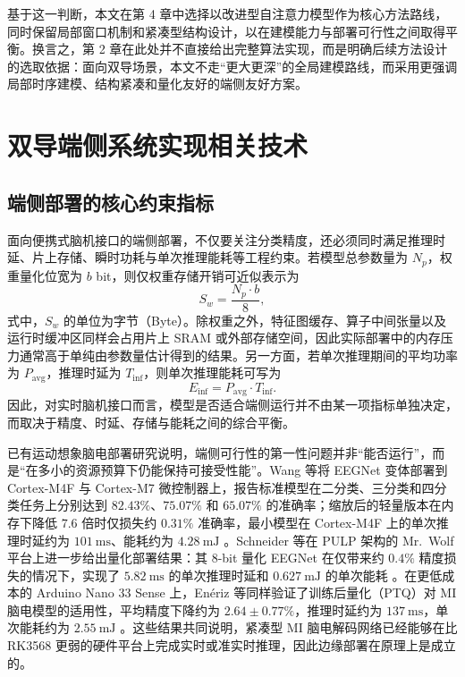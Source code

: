 基于这一判断，本文在第 4 章中选择以改进型自注意力模型作为核心方法路线，同时保留局部窗口机制和紧凑型结构设计，以在建模能力与部署可行性之间取得平衡。换言之，第 2 章在此处并不直接给出完整算法实现，而是明确后续方法设计的选取依据：面向双导场景，本文不走“更大更深”的全局建模路线，而采用更强调局部时序建模、结构紧凑和量化友好的端侧友好方案。

\section{双导端侧系统实现相关技术}

\subsection{端侧部署的核心约束指标}

面向便携式脑机接口的端侧部署，不仅要关注分类精度，还必须同时满足推理时延、片上存储、瞬时功耗与单次推理能耗等工程约束。若模型总参数量为 $N_p$，权重量化位宽为 $b$ bit，则仅权重存储开销可近似表示为
\begin{equation}
S_w = \frac{N_p \cdot b}{8},
\label{eq:edge_weight_storage}
\end{equation}
式中，$S_w$ 的单位为字节（Byte）。除权重之外，特征图缓存、算子中间张量以及运行时缓冲区同样会占用片上 SRAM 或外部存储空间，因此实际部署中的内存压力通常高于单纯由参数量估计得到的结果。另一方面，若单次推理期间的平均功率为 $P_{\mathrm{avg}}$，推理时延为 $T_{\mathrm{inf}}$，则单次推理能耗可写为
\begin{equation}
E_{\mathrm{inf}} = P_{\mathrm{avg}} \cdot T_{\mathrm{inf}}.
\label{eq:edge_energy}
\end{equation}
因此，对实时脑机接口而言，模型是否适合端侧运行并不由某一项指标单独决定，而取决于精度、时延、存储与能耗之间的综合平衡。

已有运动想象脑电部署研究说明，端侧可行性的第一性问题并非“能否运行”，而是“在多小的资源预算下仍能保持可接受性能”。Wang 等将 EEGNet 变体部署到 Cortex-M4F 与 Cortex-M7 微控制器上，报告标准模型在二分类、三分类和四分类任务上分别达到 $82.43\%$、$75.07\%$ 和 $65.07\%$ 的准确率；缩放后的轻量版本在内存下降低 $7.6$ 倍时仅损失约 $0.31\%$ 准确率，最小模型在 Cortex-M4F 上的单次推理时延约为 $101\ \text{ms}$、能耗约为 $4.28\ \text{mJ}$ \cite{Wan20}。Schneider 等在 PULP 架构的 Mr.\ Wolf 平台上进一步给出量化部署结果：其 8-bit 量化 EEGNet 在仅带来约 $0.4\%$ 精度损失的情况下，实现了 $5.82\ \text{ms}$ 的单次推理时延和 $0.627\ \text{mJ}$ 的单次能耗 \cite{Sch20}。在更低成本的 Arduino Nano 33 Sense 上，En\'eriz 等同样验证了训练后量化（PTQ）对 MI 脑电模型的适用性，平均精度下降约为 $2.64 \pm 0.77\%$，推理时延约为 $137\ \text{ms}$，单次能耗约为 $2.55\ \text{mJ}$ \cite{Ene23}。这些结果共同说明，紧凑型 MI 脑电解码网络已经能够在比 RK3568 更弱的硬件平台上完成实时或准实时推理，因此边缘部署在原理上是成立的。

